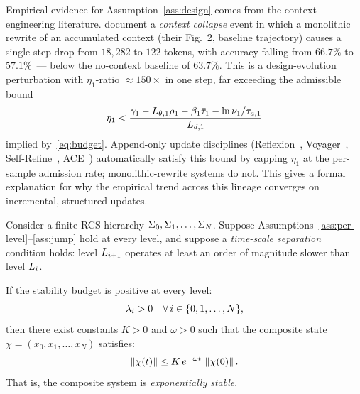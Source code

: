 \documentclass[11pt,a4paper]{article}
\begin{document}
\begin{remark}
\label{rem:context-collapse}
Empirical evidence for Assumption~\ref{ass:design} comes from the
context-engineering literature.  \citet{zhang2025ace} document a
\emph{context collapse} event in which a monolithic rewrite of an
accumulated context (their Fig.~2, baseline trajectory) causes a
single-step drop from $18{,}282$ to $122$ tokens, with accuracy
falling from $66.7\%$ to $57.1\%$~--- below the no-context baseline
of $63.7\%$.  This is a design-evolution perturbation with
$\eta_1$-ratio $\approx 150\times$ in one step, far exceeding the
admissible bound
\begin{equation}
  \eta_1 <
  \frac{\decay_1 - L_{\param,1}\rho_1 - \beta_1\taubar_1
        - \ln\nu_1/\taua[1]}{L_{d,1}}
\end{equation}
implied by~\eqref{eq:budget}.  Append-only update disciplines
(Reflexion~\cite{shinn2023reflexion}, Voyager~\cite{wang2023voyager},
Self-Refine~\cite{madaan2023selfrefine}, ACE~\cite{zhang2025ace})
automatically satisfy this bound by capping $\eta_1$ at the per-sample
admission rate; monolithic-rewrite systems do not.  This gives a
formal explanation for why the empirical trend across this lineage
converges on incremental, structured updates.
\end{remark}


\begin{theorem}
\label{thm:recursive}
Consider a finite RCS hierarchy $\Sigma_0, \Sigma_1, \ldots, \Sigma_N$.  Suppose
Assumptions~\ref{ass:per-level}--\ref{ass:jump} hold at every level, and
suppose a \emph{time-scale separation} condition holds: level $L_{i+1}$
operates at least an order of magnitude slower than level $L_{i}$.

If the stability budget is positive at every level:
\begin{equation}
  \lambda_i > 0 \quad \forall\, i \in \{0, 1, \ldots, N\},
  \label{eq:stability-condition}
\end{equation}
then there exist constants $K > 0$ and $\omega > 0$ such that the composite
state $\chi = (x_0, x_1, \ldots, x_N)$ satisfies:
\begin{equation}
  \left\| \chi(t) \right\| \leq K \, e^{-\omega t} \, \left\| \chi(0) \right\|.
\end{equation}
That is, the composite system is \emph{exponentially stable}.
\end{theorem}
\end{document}
